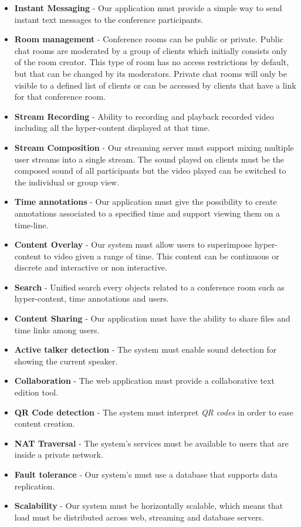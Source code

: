 \begin{itemize}
 \item \textbf{Instant Messaging} - Our application must provide a simple way to send instant text messages to the conference participants.
 \item \textbf{Room management} - Conference rooms can be public or private. Public chat rooms are moderated by a group of clients which initially consists only of the room creator. This type of room has no access restrictions by default, but that can be changed by its moderators. Private chat rooms will only be visible to a defined list of clients or can be accessed by clients that have a link for that conference room.
 \item \textbf{Stream Recording} - Ability to recording and playback recorded video including all the hyper-content displayed at that time.
 \item \textbf{Stream Composition} - Our streaming server must support mixing multiple user streams into a single stream. The sound played on clients must be the composed sound of all participants but the video played can be switched to the individual or group view.
 \item \textbf{Time annotations} - Our application must give the possibility to create annotations associated to a specified time and support viewing them on a time-line. 
 \item \textbf{Content Overlay} - Our system must allow users to superimpose hyper-content to video given a range of time. This content can be continuous or discrete and interactive or non interactive.
 \item \textbf{Search} - Unified search every objects related to a conference room such as hyper-content, time annotations and users.
 \item \textbf{Content Sharing} - Our application must have the ability to share files and time links among users.
 \item \textbf{Active talker detection} - The system must enable sound detection for showing the current speaker.
 \item \textbf{Collaboration} - The web application must provide a collaborative text edition tool.
 \item \textbf{QR Code detection} - The system must interpret \emph{QR codes} in order to ease content creation.
 \item \textbf{NAT Traversal} - The system's services must be available to users that are inside a private network.
 \item \textbf{Fault tolerance} - Our system's must use a database that supports data replication.
 \item \textbf{Scalability} - Our system must be horizontally scalable, which means that load must be distributed across web, streaming and database servers.
\end{itemize}

